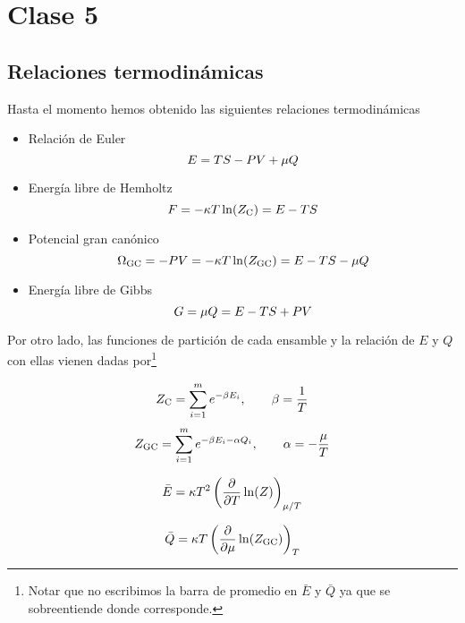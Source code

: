 \section{Clase 5}
\subsection{Relaciones termodinámicas}
Hasta el momento hemos obtenido las siguientes relaciones termodinámicas
\begin{tcolorbox}
\begin{itemize}
	\item Relación de Euler
	\begin{equation}
  E=TS-PV+\mu Q
\end{equation}
\item Energía libre de Hemholtz \begin{equation}
  F=-\kappa T\ln(Z_{\rm C})=E-TS
\end{equation}
\item Potencial gran canónico
\begin{equation}\label{5.star}
  \Omega_{\rm GC}=-PV=-\kappa T\ln (Z_{\rm GC})=E-TS-\mu Q
\end{equation}
\item Energía libre de Gibbs
\begin{equation}
  G=\mu Q=E-TS+PV
\end{equation}
\end{itemize}
\end{tcolorbox}

Por otro lado, las funciones de partición de cada ensamble y la relación de $E$ y $Q$ con ellas vienen dadas por\footnote{Notar que no escribimos la barra de promedio en $\bar{E}$ y $\bar{Q}$ ya que se sobreentiende donde corresponde.}
\begin{tcolorbox}
\begin{equation}
  Z_{\rm C} =\sum_{i=1}^m e^{-\beta E_i},\qquad \beta =\frac{1}{T}
\end{equation}
\begin{equation}
  Z_{\rm GC}=\sum_{i=1}^m e^{-\beta E_i-\alpha Q_i},\qquad \alpha=-\frac{\mu }{T}
\end{equation}

\begin{equation}\label{5.box1}
  \bar{E}=\kappa T^2\left(\pdv{T}\ln(Z)\right)_{\mu/T}
\end{equation}

\begin{equation}\label{5.box2}
 \bar{Q}=\kappa T\left(\pdv{\mu}\ln(Z_{\rm GC})\right)_T
\end{equation}
\end{tcolorbox}

